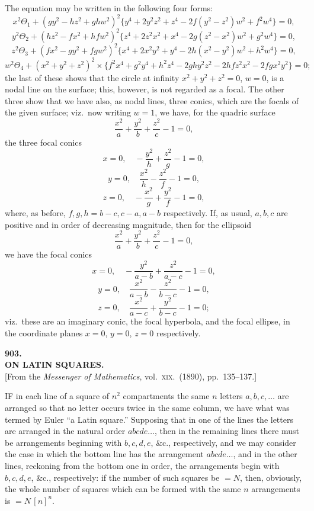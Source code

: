 \documentclass[11pt,a4paper]{article}
\begin{document}
The equation may be written in the following four forms:
\[
x^2 \Theta_1 + (g y^2 - h z^2 + g h w^2)^2 \{y^4 + 2 y^2 z^2 + z^4 - 2 f(y^2 - z^2) w^2 + f^2 w^4\} = 0,
\]
\[
y^2 \Theta_2 + (h z^2 - f x^2 + h f w^2)^2 \{z^4 + 2 z^2 x^2 + x^4 - 2 g(z^2 - x^2) w^2 + g^2 w^4\} = 0,
\]
\[
z^2 \Theta_3 + (f x^2 - g y^2 + f g w^2)^2 \{x^4 + 2 x^2 y^2 + y^4 - 2 h(x^2 - y^2) w^2 + h^2 w^4\} = 0,
\]
\[
w^2 \Theta_4 + (x^2 + y^2 + z^2)^2 \times \{f^2 x^4 + g^2 y^4 + h^2 z^4 - 2 g h y^2 z^2 - 2 h f z^2 x^2 - 2 f g x^2 y^2\} = 0;
\]
the last of these shows that the circle at infinity $x^2 + y^2 + z^2 = 0$, $w = 0$, is a nodal line on the surface; this, however, is not regarded as a focal. The other three show that we have also, as nodal lines, three conics, which are the focals of the given surface; viz.\ now writing $w = 1$, we have, for the quadric surface
\[
\frac{x^2}{a} + \frac{y^2}{b} + \frac{z^2}{c} - 1 = 0,
\]
the three focal conics
\[
x = 0,\quad -\frac{y^2}{h} + \frac{z^2}{g} - 1 = 0,
\]
\[
y = 0,\quad \frac{x^2}{h} - \frac{z^2}{f} - 1 = 0,
\]
\[
z = 0,\quad -\frac{x^2}{g} + \frac{y^2}{f} - 1 = 0,
\]
where, as before, $f, g, h = b - c, c - a, a - b$ respectively. If, as usual, $a, b, c$ are positive and in order of decreasing magnitude, then for the ellipsoid
\[
\frac{x^2}{a} + \frac{y^2}{b} + \frac{z^2}{c} - 1 = 0,
\]
we have the focal conics
\[
x = 0,\quad -\frac{y^2}{a - b} + \frac{z^2}{a - c} - 1 = 0,
\]
\[
y = 0,\quad \frac{x^2}{a - b} - \frac{z^2}{b - c} - 1 = 0,
\]
\[
z = 0,\quad \frac{x^2}{a - c} + \frac{y^2}{b - c} - 1 = 0;
\]
viz.\ these are an imaginary conic, the focal hyperbola, and the focal ellipse, in the coordinate planes $x = 0$, $y = 0$, $z = 0$ respectively.

\clearpage

\begin{center}
{\large\bfseries 903.}\\[0.5em]
{\large\bfseries ON LATIN SQUARES.}\\[0.5em]
\small [From the \emph{Messenger of Mathematics}, vol.\ \textsc{xix}.\ (1890), pp.\ 135--137.]
\end{center}
\medskip

\noindent IF in each line of a square of $n^2$ compartments the same $n$ letters $a, b, c, \ldots$ are arranged so that no letter occurs twice in the same column, we have what was termed by Euler ``a Latin square.'' Supposing that in one of the lines the letters are arranged in the natural order $abcde\ldots$, then in the remaining lines there must be arrangements beginning with $b, c, d, e$, \&c., respectively, and we may consider the case in which the bottom line has the arrangement $abcde\ldots$, and in the other lines, reckoning from the bottom one in order, the arrangements begin with $b, c, d, e$, \&c., respectively: if the number of such squares be $= N$, then, obviously, the whole number of squares which can be formed with the same $n$ arrangements is $= N\,[n]^n$.
\end{document}

